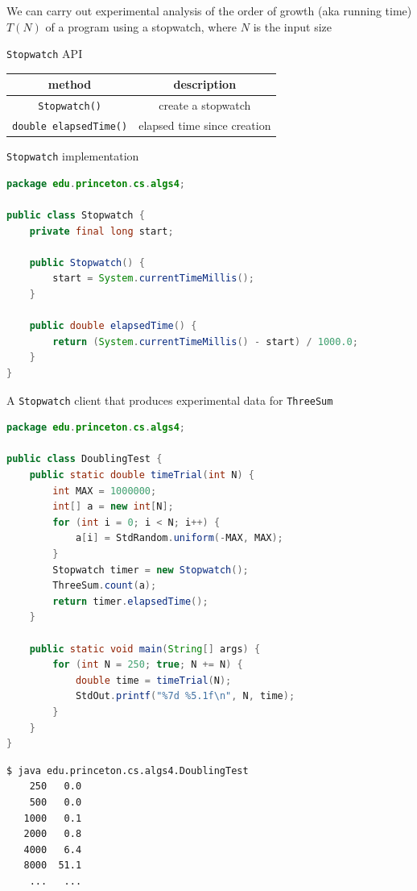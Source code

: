 \documentclass[8pt,a4paper,compress]{beamer}
\begin{document}
\begin{frame}[fragile]
\pause

We can carry out experimental analysis of the order of growth (aka running time) $T(N)$ of a program using a stopwatch, where $N$ is the input size

\pause
\bigskip

\lstinline{Stopwatch} API
\begin{center}
\begin{tabular}{cc}
method & description \\ \hline
\lstinline$Stopwatch()$ & create a stopwatch \\
\lstinline$double elapsedTime()$ & elapsed time since creation
\end{tabular} 
\end{center}

\pause
\bigskip

\lstinline{Stopwatch} implementation
\begin{lstlisting}[language=Java]
package edu.princeton.cs.algs4;

public class Stopwatch {
    private final long start;
    
    public Stopwatch() { 
        start = System.currentTimeMillis(); 
    }
    
    public double elapsedTime() {
        return (System.currentTimeMillis() - start) / 1000.0;
    }
}
\end{lstlisting}
\end{frame}

\begin{frame}[fragile]
\pause

A \lstinline{Stopwatch} client that produces experimental data for \lstinline{ThreeSum}
\begin{lstlisting}[language=Java]
package edu.princeton.cs.algs4;

public class DoublingTest {
    public static double timeTrial(int N) {
        int MAX = 1000000;
        int[] a = new int[N];
        for (int i = 0; i < N; i++) {
            a[i] = StdRandom.uniform(-MAX, MAX);
        }
        Stopwatch timer = new Stopwatch();
        ThreeSum.count(a);
        return timer.elapsedTime();
    }

    public static void main(String[] args) { 
        for (int N = 250; true; N += N) {
            double time = timeTrial(N);
            StdOut.printf("%7d %5.1f\n", N, time);
        } 
    } 
} 
\end{lstlisting}

\pause

\begin{lstlisting}[language={}]
$ java edu.princeton.cs.algs4.DoublingTest
    250   0.0
    500   0.0
   1000   0.1
   2000   0.8
   4000   6.4
   8000  51.1
    ...   ...
\end{lstlisting}
\end{frame}
\end{document}
